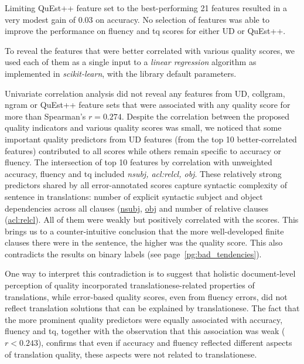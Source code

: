 Limiting QuEst++ feature set to the best-performing 21 features resulted in a very modest gain of 0.03 on accuracy. %
No selection of features was able to improve the performance on fluency and tq scores for either UD or QuEst++. 

To reveal the features that were better correlated with various quality scores, we used each of them as a single input to a \textit{linear regression} algorithm as implemented in \textit{scikit-learn}, with the library default parameters.  %

Univariate correlation analysis did not reveal any features from UD, collgram, ngram or QuEst++ feature sets that were associated with any quality score for more than Spearman's $r=0.274$. %
\label{pg:scores_not_translationese}
Despite the correlation between the proposed quality indicators and various quality scores was small, we noticed that some important quality predictors from UD features (from the top 10 better-correlated features) contributed to all scores while others remain specific to accuracy or fluency. The intersection of top 10 features by correlation with unweighted accuracy, fluency and tq included \textit{nsubj, acl:relcl, obj}. These relatively strong predictors shared by all error-annotated scores capture syntactic complexity of sentence in translations: number of explicit syntactic subject and object dependencies across all clauses (\hyperlink{ft:nsubj}{nsubj}, \hyperlink{ft:obj}{obj} and number of relative clauses (\hyperlink{ft:acl:relcl}{acl:relcl}). All of them were weakly but positively correlated with the scores. This brings us to a counter-intuitive conclusion that the more well-developed finite clauses there were in the sentence, the higher was the quality score. This also contradicts the results on binary labels (see page~\ref{pg:bad_tendencies}).

One way to interpret this contradiction is to suggest that holistic document-level perception of quality incorporated translationese-related properties of translations, while error-based quality scores, even from fluency errors, did not reflect translation solutions that can be explained by translationese. 
The fact that the more prominent quality predictors were equally associated with accuracy, fluency and tq, together with the observation that this association was weak ($r<0.243$), confirms that even if accuracy and fluency reflected different aspects of translation quality, these aspects were not related to translationese.

